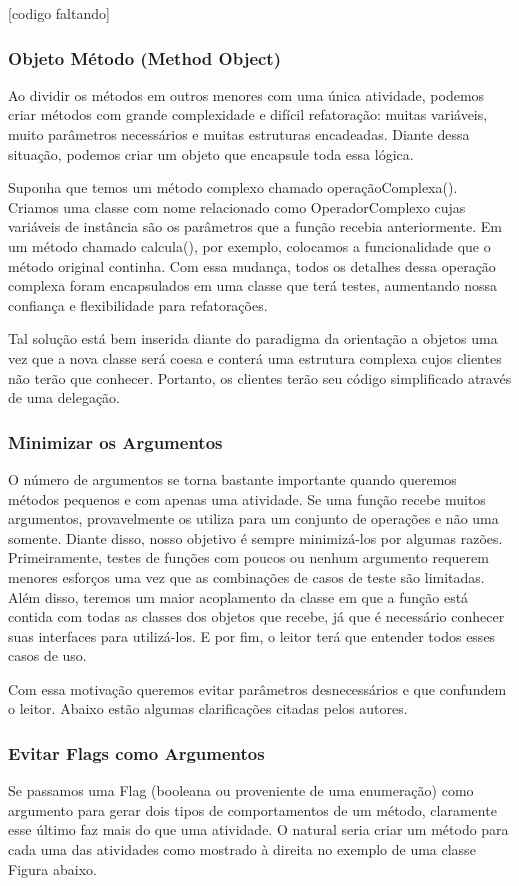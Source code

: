 [codigo faltando]

\subsubsection{Objeto Método (Method Object)}
	Ao dividir os métodos em outros menores com uma única atividade, podemos criar métodos com grande complexidade e difícil refatoração: muitas variáveis, muito parâmetros necessários e muitas estruturas encadeadas. Diante dessa situação, podemos criar um objeto que encapsule toda essa lógica. 
	
	Suponha que temos um método complexo chamado operaçãoComplexa(). Criamos uma classe com nome relacionado como OperadorComplexo cujas variáveis de instância são os parâmetros que a função recebia anteriormente. Em um método chamado calcula(), por exemplo, colocamos a funcionalidade que o método original continha. Com essa mudança, todos os detalhes dessa operação complexa foram encapsulados em uma classe que terá testes, aumentando nossa confiança e flexibilidade para refatorações.
	
	Tal solução está bem inserida diante do paradigma da orientação a objetos uma vez que a nova  classe será coesa e conterá uma estrutura complexa cujos clientes não terão que conhecer. Portanto, os clientes terão seu código simplificado através de uma delegação.

\subsubsection{Minimizar os Argumentos}
 	O número de argumentos se torna bastante importante quando queremos métodos pequenos e com apenas uma atividade. Se uma função recebe muitos argumentos, provavelmente os utiliza para um conjunto de operações e não uma somente. Diante disso, nosso objetivo é sempre minimizá-los por algumas razões. 	Primeiramente, testes de funções com poucos ou nenhum argumento requerem menores esforços  uma vez que as combinações de casos de teste são limitadas. Além disso, teremos um maior acoplamento da classe em que a função está contida com todas as classes dos objetos que recebe, já que é necessário conhecer suas interfaces para utilizá-los. E por fim, o leitor terá que entender todos esses casos de uso.

	Com essa motivação queremos evitar parâmetros desnecessários e que confundem o leitor. Abaixo estão algumas clarificações citadas pelos autores.

\subsubsection{Evitar Flags como Argumentos}
	Se passamos uma Flag (booleana ou proveniente de uma enumeração) como argumento para gerar dois tipos de comportamentos de um método, claramente esse último faz mais do que uma atividade. O natural seria criar um método para cada uma das atividades como mostrado à direita no exemplo de uma classe Figura abaixo.

